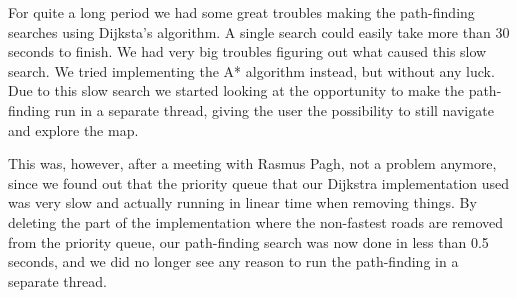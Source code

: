 For quite a long period we had some great troubles making the path-finding searches using Dijksta's algorithm. A single search could easily take more than 30 seconds to finish. We had very big troubles figuring out what caused this slow search. We tried implementing the A* algorithm instead, but without any luck. Due to this slow search we started looking at the opportunity to make the path-finding run in a separate thread, giving the user the possibility to still navigate and explore the map. 

This was, however, after a meeting with Rasmus Pagh, not a problem anymore, since we found out that the priority queue that our Dijkstra implementation used was very slow and actually running in linear time when removing things. By deleting the part of the implementation where the non-fastest roads are removed from the priority queue, our path-finding search was now done in less than 0.5 seconds, and we did no longer see any reason to run the path-finding in a separate thread.